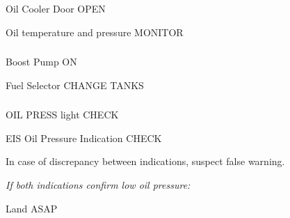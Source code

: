 \begin{multicols}{2}
\subsubsection*{}

\begin{enumerate*}
\item Oil Cooler Door \dotfill OPEN
\item Oil temperature and pressure \dotfill MONITOR
\end{enumerate*}

\subsubsection*{}

\begin{enumerate*}
\item Boost Pump \dotfill ON
\item Fuel Selector \dotfill CHANGE TANKS
\end{enumerate*}

\subsubsection*{}

\begin{enumerate*}
\item OIL PRESS light \dotfill CHECK
\item EIS Oil Pressure Indication \dotfill CHECK
\begin{Note}
In case of discrepancy between indications, suspect false warning.
\end{Note}
\item \emph{If both indications confirm low oil pressure:}
\begin{itemize*}
  \item Land ASAP
  \end{itemize*}
\end{enumerate*}

\subsubsection*{}


\end{multicols}

